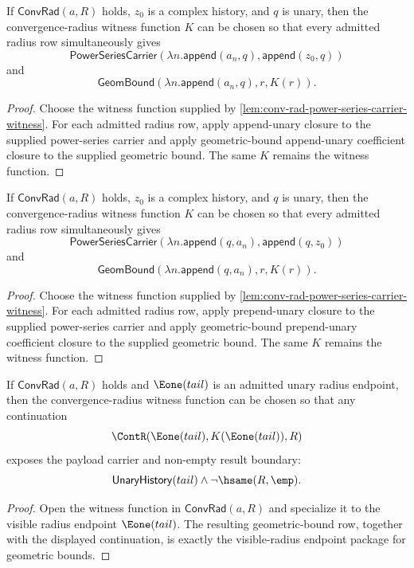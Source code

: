 \begin{lemma}
\label{thm:convrad-power-series-carrier-append-unary-witness}
If $\mathsf{ConvRad}(a,R)$ holds, $z_0$ is a complex history, and $q$ is unary,
then the convergence-radius witness function $K$ can be chosen so that every
admitted radius row simultaneously gives
$$
\mathsf{PowerSeriesCarrier}(\lambda n.\mathsf{append}(a_n,q),\mathsf{append}(z_0,q))
$$
and
$$
\mathsf{GeomBound}(\lambda n.\mathsf{append}(a_n,q),r,K(r)).
$$
\end{lemma}
\begin{proof}
Choose the witness function supplied by
\autoref{lem:conv-rad-power-series-carrier-witness}. For each admitted radius
row, apply append-unary closure to the supplied power-series carrier and
apply geometric-bound append-unary coefficient closure to the supplied
geometric bound. The same $K$ remains the witness function.
\end{proof}

\begin{lemma}
\label{thm:conv-rad-power-series-carrier-prepend-unary-witness}
If $\mathsf{ConvRad}(a,R)$ holds, $z_0$ is a complex history, and $q$ is unary,
then the convergence-radius witness function $K$ can be chosen so that every
admitted radius row simultaneously gives
$$
\mathsf{PowerSeriesCarrier}(\lambda n.\mathsf{append}(q,a_n),\mathsf{append}(q,z_0))
$$
and
$$
\mathsf{GeomBound}(\lambda n.\mathsf{append}(q,a_n),r,K(r)).
$$
\end{lemma}
\begin{proof}
Choose the witness function supplied by
\autoref{lem:conv-rad-power-series-carrier-witness}. For each admitted radius
row, apply prepend-unary closure to the supplied power-series carrier and
apply geometric-bound prepend-unary coefficient closure to the supplied
geometric bound. The same $K$ remains the witness function.
\end{proof}

\begin{theorem}
\label{thm:convrad-visible-radius-witness-endpoint-package}
If $\mathsf{ConvRad}(a,R)$ holds and $\Eone(tail)$ is an admitted unary radius
endpoint, then the convergence-radius witness function can be chosen so that
any continuation
$$
\ContR(\Eone(tail),K(\Eone(tail)),R)
$$
exposes the payload carrier and non-empty result boundary:
$$
\mathsf{UnaryHistory}(tail)\land \neg\hsame(R,\emp).
$$
\end{theorem}
\begin{proof}
Open the witness function in $\mathsf{ConvRad}(a,R)$ and specialize it to the
visible radius endpoint $\Eone(tail)$. The resulting geometric-bound row,
together with the displayed continuation, is exactly the visible-radius endpoint
package for geometric bounds.
\end{proof}

